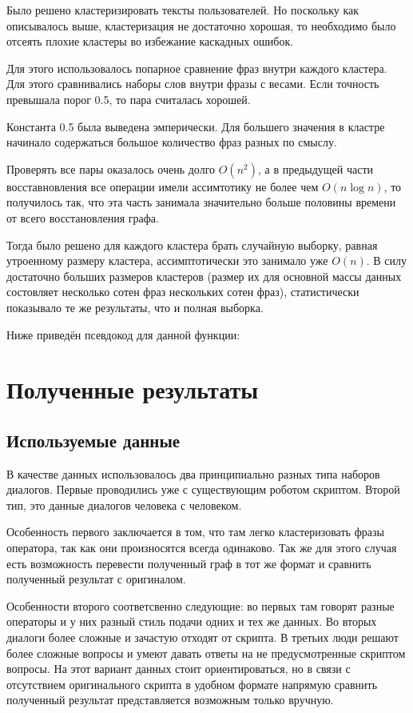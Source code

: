\documentclass[specification,annotation]{itmo-student-thesis}
\begin{document}
	Было решено кластеризировать тексты пользователей. Но поскольку как описывалось выше, кластеризация не достаточно хорошая, то необходимо было отсеять плохие кластеры во избежание каскадных ошибок.
	
	
	Для этого использовалось попарное сравнение фраз внутри каждого кластера. Для этого сравнивались наборы слов внутри фразы с весами. Если точность превышала порог 0.5, то пара считалась хорошей.
	
	Константа 0.5 была выведена эмперически. Для большего значения в кластре начинало содержаться большое количество фраз разных по смыслу. 
	
	Проверять все пары оказалось очень долго $O(n^2)$, а в предыдущей части восставновления все операции имели ассимтотику не более чем $O(n \log n)$, то получилось так, что эта часть занимала значительно больше половины времени от всего восстановления графа. 
	
	Тогда было решено для каждого кластера брать случайную выборку, равная утроенному размеру кластера, ассимптотически это занимало уже $O(n)$. В силу достаточно больших размеров кластеров (размер их для основной массы данных состовляет несколько сотен фраз нескольких сотен фраз), статистически показывало те же результаты, что и полная выборка.
	
	Ниже приведён псевдокод для данной функции:
	
	
	\chapter{Полученные результаты}
	\section{Используемые данные}
	В качестве данных использовалось два принципиально разных типа наборов диалогов. Первые проводились уже с существующим роботом скриптом. Второй тип, это данные диалогов человека с человеком.
	
	Особенность первого заключается в том, что там легко кластеризовать фразы оператора, так как они произносятся всегда одинаково. Так же для этого случая есть возможность перевести полученный граф в тот же формат и сравнить полученный результат с оригиналом.
	
	Особенности второго соответсвенно следующие: во первых там говорят разные операторы и у них разный стиль подачи одних и тех же данных. Во вторых диалоги более сложные и зачастую отходят от скрипта. В третьих люди решают более сложные вопросы и умеют давать ответы на не предусмотренные скриптом вопросы. На этот вариант данных стоит ориентироваться, но в связи с отсутствием оригинального скрипта в удобном формате напрямую сравнить полученный результат представляется возможным только вручную.
	
\end{document}
